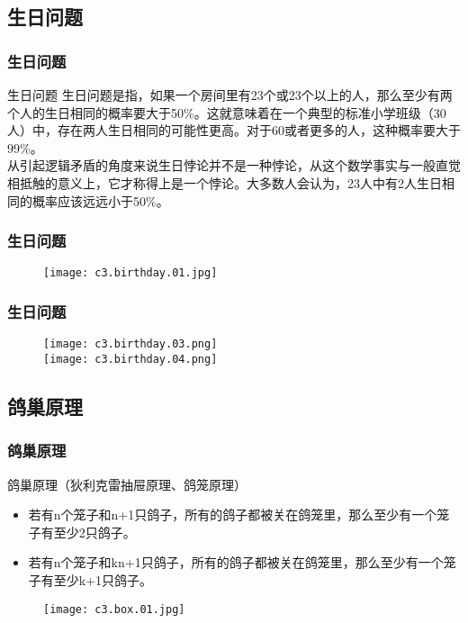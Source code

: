 \subsection{生日问题}
\begin{frame}
  \frametitle{生日问题}
  \begin{block}{生日问题}
生日问题是指，如果一个房间里有23个或23个以上的人，那么至少有两个人的生日相同的概率要大于50\%。这就意味着在一个典型的标准小学班级（30人）中，存在两人生日相同的可能性更高。对于60或者更多的人，这种概率要大于99\%。\\
\vspace{0.3em}
从引起逻辑矛盾的角度来说生日悖论并不是一种悖论，从这个数学事实与一般直觉相抵触的意义上，它才称得上是一个悖论。大多数人会认为，23人中有2人生日相同的概率应该远远小于50\%。
  \end{block}
\end{frame}

\begin{frame}
  \frametitle{生日问题}
  \begin{figure}
    \centering
    \texttt{[image: c3.birthday.01.jpg]}
  \end{figure}
\end{frame}

\begin{frame}
  \frametitle{生日问题}
  \begin{figure}
    \centering
    \texttt{[image: c3.birthday.03.png]}\\
    \texttt{[image: c3.birthday.04.png]}
  \end{figure}
\end{frame}

\subsection{鸽巢原理}
\begin{frame}
  \frametitle{鸽巢原理}
  \begin{block}{鸽巢原理（狄利克雷抽屉原理、鸽笼原理）}
    \begin{itemize}
      \item 若有n个笼子和n+1只鸽子，所有的鸽子都被关在鸽笼里，那么至少有一个笼子有至少2只鸽子。
      \item 若有n个笼子和kn+1只鸽子，所有的鸽子都被关在鸽笼里，那么至少有一个笼子有至少k+1只鸽子。
    \end{itemize}
  \end{block}
  \vspace{-0.5em}
  \begin{figure}
    \centering
    \texttt{[image: c3.box.01.jpg]}
  \end{figure}
\end{frame}

